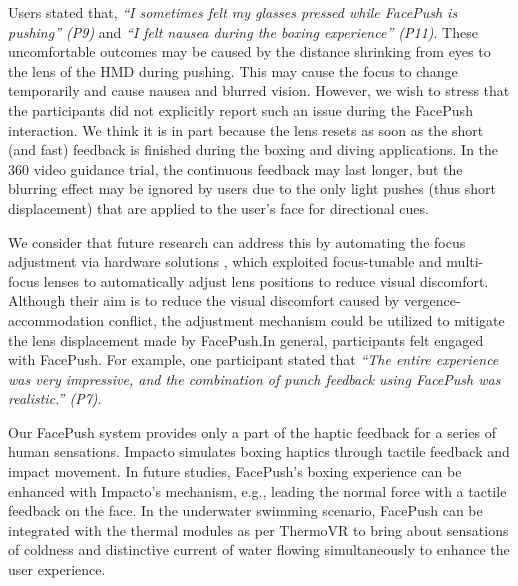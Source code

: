 Users stated that, \textit{``I sometimes felt my glasses pressed while FacePush is pushing'' (P9)} and \textit{``I felt nausea during the boxing experience'' (P11)}. These uncomfortable outcomes may be caused by the distance shrinking from eyes to the lens of the HMD during pushing. This may cause the focus to change temporarily and cause nausea and blurred vision. However, we wish to stress that the participants did not explicitly report such an issue during the FacePush interaction. We think it is in part because the lens resets as soon as the short (and fast) feedback is finished during the boxing and diving applications. In the 360 video guidance trial, the continuous feedback may last longer, but the blurring effect may be ignored by users due to the only light pushes (thus short displacement) that are applied to the user's face for directional cues.

We consider that future research can address this by automating the focus adjustment via hardware solutions \cite{Konrad:2016:NOC:2858036.2858140,Optimizing.virtual.reality,Varifocal}, which exploited focus-tunable and multi-focus lenses to automatically adjust lens positions to reduce visual discomfort. Although their aim is to reduce the visual discomfort caused by vergence-accommodation conflict, the adjustment mechanism could be utilized to mitigate the lens displacement made by FacePush.In general, participants felt engaged with FacePush. For example, one participant stated that \textit{``The entire experience was very impressive, and the combination of punch feedback using FacePush was realistic.'' (P7)}. 

Our FacePush system provides only a part of the haptic feedback for a series of human sensations. Impacto \cite{Impacto} simulates boxing haptics through tactile feedback and impact movement. In future studies, FacePush's boxing experience can be enhanced with Impacto's mechanism, e.g., leading the normal force with a tactile feedback on the face. In the underwater swimming scenario, FacePush can be integrated with the thermal modules as per ThermoVR \cite{ThermoVR} to bring about sensations of coldness and distinctive current of water flowing simultaneously to enhance the user experience.

